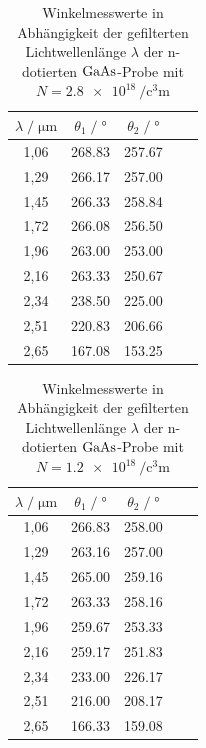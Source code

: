 \documentclass[
  bibliography=totoc,     %
  captions=tableheading,  %
  titlepage=firstiscover, %
]{scrartcl}
\begin{document}
\begin{table}
    \centering
    \caption{Winkelmesswerte in Abhängigkeit der gefilterten Lichtwellenlänge $\lambda$ 
        der n-dotierten $\ce{GaAs}$-Probe mit $N = \SI{2.8e18}{\per\cubic\centi\meter}$}
    \label{tab:mess3}
    \begin{tabular}{c c c c c}
    \toprule
    $\lambda \;/\; \si{\micro\meter}$ & $\theta_1 \;/\; \si{\degree}$ &  $\theta_2 \;/\; \si{\degree}$\\
    \midrule
        1,06 & 268.83 & 257.67 \\ 
        1,29 & 266.17 & 257.00 \\
        1,45 & 266.33 & 258.84 \\
        1,72 & 266.08 & 256.50 \\ 
        1,96 & 263.00 & 253.00 \\ 
        2,16 & 263.33 & 250.67 \\ 
        2,34 & 238.50 & 225.00 \\ 
        2,51 & 220.83 & 206.66 \\ 
        2,65 & 167.08 & 153.25 \\ 
    \bottomrule
    \end{tabular}
\end{table}

\begin{table}
    \centering
    \caption{Winkelmesswerte in Abhängigkeit der gefilterten Lichtwellenlänge $\lambda$ 
        der n-dotierten $\ce{GaAs}$-Probe mit $N = \SI{1.2e18}{\per\cubic\centi\meter}$}
    \label{tab:mess4}
    \begin{tabular}{c c c c c}
    \toprule
    $\lambda \;/\; \si{\micro\meter}$ & $\theta_1 \;/\; \si{\degree}$ &  $\theta_2 \;/\; \si{\degree}$\\
    \midrule
        1,06 & 266.83 & 258.00 \\ 
        1,29 & 263.16 & 257.00 \\
        1,45 & 265.00 & 259.16 \\
        1,72 & 263.33 & 258.16 \\
        1,96 & 259.67 & 253.33 \\
        2,16 & 259.17 & 251.83 \\
        2,34 & 233.00 & 226.17 \\
        2,51 & 216.00 & 208.17 \\
        2,65 & 166.33 & 159.08 \\
    \bottomrule
    \end{tabular}
\end{table}
\end{document}
